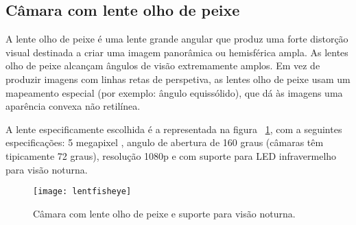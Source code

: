 \subsection{Câmara com lente olho de peixe}

A lente olho de peixe é uma lente grande angular que produz uma forte distorção visual destinada a criar uma imagem panorâmica ou hemisférica ampla. As lentes olho de peixe alcançam ângulos de visão extremamente amplos. Em vez de produzir imagens com linhas retas de perspetiva, as lentes olho de peixe usam um mapeamento especial (por exemplo: ângulo equissólido), que dá às imagens uma aparência convexa não retilínea.

A lente especificamente escolhida é a representada na figura ~\ref{fig:lentfisheye}, com a seguintes especificações: 5 megapixel , angulo de abertura de 160 graus (câmaras têm tipicamente 72 graus), resolução 1080p e com suporte para LED infravermelho para visão noturna.

\begin{figure}%
	\begin{center}
		\leavevmode		
		\texttt{[image: lentfisheye]}
		\caption{Câmara com lente olho de peixe e suporte para visão noturna.}
		\label{fig:lentfisheye}
	\end{center}
\end{figure}
